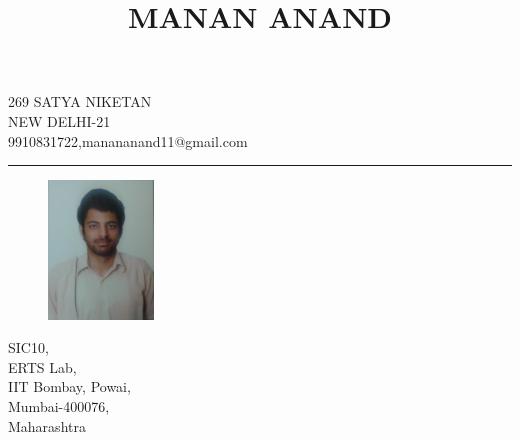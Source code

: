 \documentclass{article}
\date{}
\begin{document}
\title{MANAN ANAND}
\maketitle
\vspace{-2cm}

\begin{center}

{\large 269 SATYA NIKETAN\\
NEW DELHI-21\\
9910831722,manananand11@gmail.com\par} 
\end{center}
\noindent\rule{15cm}{1pt}


\begin{figure}
    \centering
    \includegraphics[width=0.25\textwidth]{manan_resume}
\end{figure}

SIC10,\\
ERTS Lab,\\
IIT Bombay, Powai,\\
Mumbai-400076,\\
Maharashtra
\end{document}
